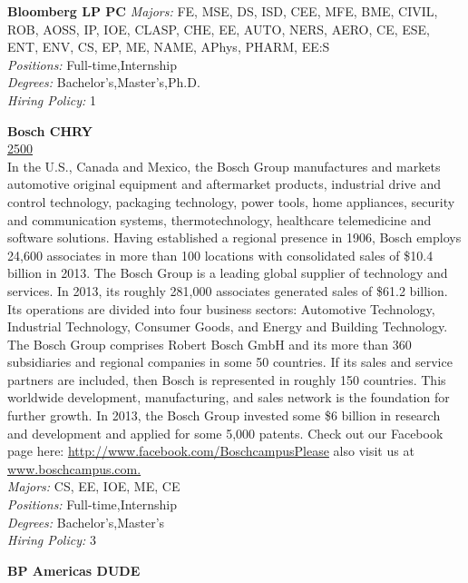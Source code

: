 \documentclass[twoside]{article}
\begin{document}
\begin{center}
\begin{multicols}{2}
\begin{minipage}{.95\columnwidth}{\Large\bf Bloomberg LP \hfill PC}
    \emph{Majors:} FE, MSE, DS, ISD, CEE, MFE, BME, CIVIL, ROB, AOSS, IP, IOE, CLASP, CHE, EE, AUTO, NERS, AERO, CE, ESE, ENT, ENV, CS, EP, ME, NAME, APhys, PHARM, EE:S\\
    \emph{Positions:} Full-time,Internship\\
    \emph{Degrees:} Bachelor's,Master's,Ph.D.\\
    \emph{Hiring Policy:} 1\\
\end{minipage}
 \begin{minipage}{.95\columnwidth}{\Large\bf Bosch \hfill CHRY}\\
    \url{2500}\\
    In the U.S., Canada and Mexico, the Bosch Group manufactures and markets automotive original equipment and aftermarket products, industrial drive and control technology, packaging technology, power tools, home appliances, security and communication systems, thermotechnology, healthcare telemedicine and software solutions. Having established a regional presence in 1906, Bosch employs 24,600 associates in more than 100 locations with consolidated sales of \$10.4 billion in 2013. The Bosch Group is a leading global supplier of technology and services. In 2013, its roughly 281,000 associates generated sales of \$61.2 billion. Its operations are divided into four business sectors: Automotive Technology, Industrial Technology, Consumer Goods, and Energy and Building Technology. The Bosch Group comprises Robert Bosch GmbH and its more than 360 subsidiaries and regional companies in some 50 countries. If its sales and service partners are included, then Bosch is represented in roughly 150 countries. This worldwide development, manufacturing, and sales network is the foundation for further growth. In 2013, the Bosch Group invested some \$6 billion in research and development and applied for some 5,000 patents. Check out our Facebook page here: \url{http://www.facebook.com/BoschcampusPlease} also visit us at \url{www.boschcampus.com.}\\
    \emph{Majors:} CS, EE, IOE, ME, CE\\
    \emph{Positions:} Full-time,Internship\\
    \emph{Degrees:} Bachelor's,Master's\\
    \emph{Hiring Policy:} 3\\
\end{minipage}
 \begin{minipage}{.95\columnwidth}{\Large\bf BP Americas \hfill DUDE}\\

\end{minipage}
\end{multicols}
\end{center}
\end{document}
